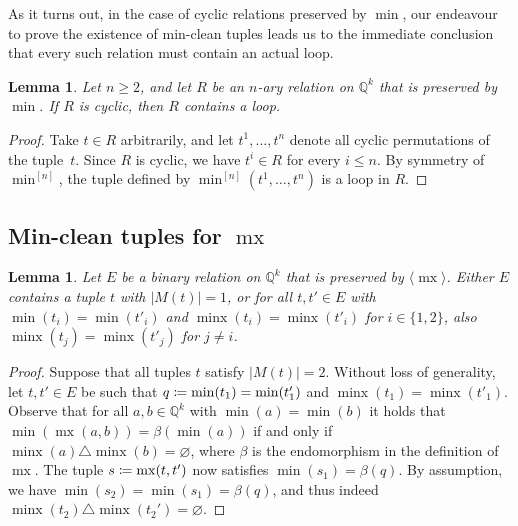 \documentclass[a4paper,reqno, cleveref]{amsart}
\newcommand{\coloneqq}{\mathrel{\mathop:}\mathrel{\mkern-1.2mu}=}
\newtheorem{lemma}[theorem]{Lemma}
\newcommand{\Q}{\mathbb{Q}}
\DeclareMathOperator{\mx}{mx}
\DeclareMathOperator{\minx}{minx}
\newcommand{\bin}{E}
\newcommand{\nested}[2]{{#1^{[#2]}}}
\newcommand{\gen}[1]{\langle#1\rangle}
\begin{document}
As it turns out, in the case of cyclic %
relations preserved by $\min$, our endeavour to prove the existence of min-clean tuples  leads us to the immediate conclusion that every such relation must contain an actual loop. %

\begin{lemma} \label{lemma:hypmin:minclean}
Let $n \geq 2$, and  let $R$ be an $n$-ary relation on $\Q^k$ that is preserved by $\min$. If $R$ is cyclic, then $R$ contains a loop.
\end{lemma}
\begin{proof}
    Take $t\in R$ arbitrarily, and let $t^1, \dots, t^n $ denote all cyclic permutations of the tuple~$t$. Since $R$ is cyclic, we have $t^i \in R$ for every $i\leq n$.
    By symmetry of $\nested{\min}{n}$, the tuple defined by $\nested{\min}{n}  (t^1, \dots, t^n)$  is a  loop in $R$. 
\end{proof}



\subsection{Min-clean tuples for \texorpdfstring{$\mx$}{mx}}

\begin{lemma}\label{l:mx:fencing}
Let $\bin$ be a binary relation on $\Q^k$ that is preserved by $\gen{\mx}$. Either $\bin$ contains a tuple $t$ with $|M(t)|=1$, or  
for all $t, t'\in \bin$ with $\min(t_i)=\min(t'_i)$ and $\minx(t_i)=\minx(t'_i)$ for $i \in \{1,2\}$, also  $\minx(t_j)=\minx(t'_j)$ for $j \neq i$.
\end{lemma}
\begin{proof}
   Suppose that all tuples $t$ satisfy $|M(t)|=2$. Without loss of generality, let $t, t'\in \bin$ be such that $q\coloneqq\min(t_1)=\min(t'_1)$ and $\minx(t_1)=\minx(t'_1)$. 
    Observe that for all $a,b \in \Q^k$ with $\min(a)=\min(b)$ it holds that $\min(\mx(a, b))=\beta(\min(a))$ if and only if $\minx(a)\triangle\minx(b)=\varnothing$, where $\beta$ is the endomorphism in the definition of $\mx$. The tuple $s\coloneqq\mx(t, t')$ now satisfies $\min(s_1)=\beta(q)$. 
    By assumption, we have $\min(s_2)=\min(s_1)=\beta(q)$, and thus indeed $\minx(t_2)\triangle\minx(t_2')=\varnothing$.
\end{proof}
\end{document}
